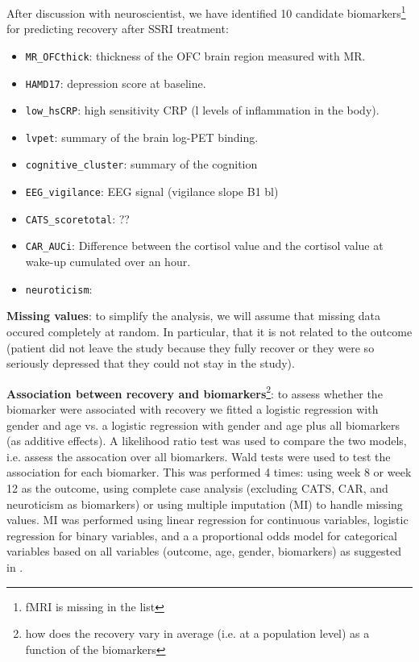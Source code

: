 \documentclass[12pt]{article}
\begin{document}
After discussion with neuroscientist, we have identified 10 candidate
biomarkers\footnote{fMRI is missing in the list} for predicting recovery after SSRI treatment:
\begin{itemize}
\item \texttt{MR\_OFCthick}: thickness of the OFC brain region measured with MR.
\item \texttt{HAMD17}: depression score at baseline.
\item \texttt{low\_hsCRP}: high sensitivity CRP (l levels of inflammation in the body).
\item \texttt{lvpet}: summary of the brain log-PET binding.
\item \texttt{cognitive\_cluster}: summary of the cognition
\item \texttt{EEG\_vigilance}: EEG signal (vigilance slope B1 bl)
\item \texttt{CATS\_scoretotal}: ??
\item \texttt{CAR\_AUCi}: Difference between the cortisol value and the cortisol value at wake-up cumulated over an hour.
\item \texttt{neuroticism}:
\end{itemize}

\bigskip

\textbf{Missing values}: to simplify the analysis, we will assume that
missing data occured completely at random. In particular, that it is
not related to the outcome (patient did not leave the study because
they fully recover or they were so seriously depressed that they could
not stay in the study).

\bigskip

\textbf{Association between recovery and biomarkers}\footnote{how does the
recovery vary in average (i.e. at a population level) as a function of
the biomarkers}: to assess whether the biomarker were associated with
recovery we fitted a logistic regression with gender and age vs. a
logistic regression with gender and age plus all biomarkers (as
additive effects). A likelihood ratio test was used to compare the two
models, i.e. assess the assocation over all biomarkers. Wald tests
were used to test the association for each biomarker. \newline This
was performed 4 times: using week 8 or week 12 as the outcome, using
complete case analysis (excluding CATS, CAR, and neuroticism as
biomarkers) or using multiple imputation (MI) to handle missing
values. MI was performed using linear regression for continuous
variables, logistic regression for binary variables, and a a
proportional odds model for categorical variables based on all
variables (outcome, age, gender, biomarkers) as suggested in
\cite{moons2006using}.
\end{document}
